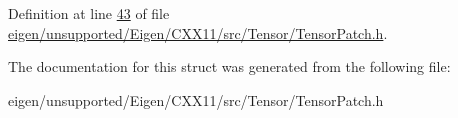 Definition at line \hyperlink{eigen_2unsupported_2_eigen_2_c_x_x11_2src_2_tensor_2_tensor_patch_8h_source_l00043}{43} of file \hyperlink{eigen_2unsupported_2_eigen_2_c_x_x11_2src_2_tensor_2_tensor_patch_8h_source}{eigen/unsupported/\+Eigen/\+C\+X\+X11/src/\+Tensor/\+Tensor\+Patch.\+h}.



The documentation for this struct was generated from the following file\+:\begin{DoxyCompactItemize}
\item 
eigen/unsupported/\+Eigen/\+C\+X\+X11/src/\+Tensor/\+Tensor\+Patch.\+h\end{DoxyCompactItemize}
